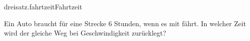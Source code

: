 \begin{exercise}{dreisatz.fahrtzeit}{Fahrtzeit}
  \ifproblem\problem\par
    Ein Auto braucht für eine Strecke 6 Stunden, wenn es mit  fährt.
    In welcher Zeit wird der gleiche Weg bei  Geschwindigkeit zurücklegt?
  \fi
\end{exercise}

